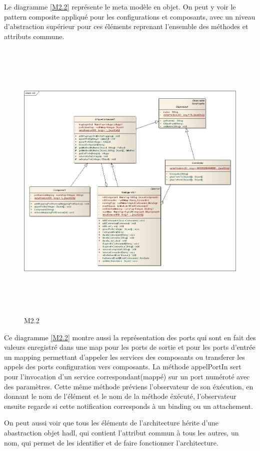 \documentclass[11pt,a4paper]{article}
\begin{document}
Le diagramme \ref{M2.2} représente le meta modèle en objet. On peut y voir le pattern composite appliqué pour les configurations et composants, avec un niveau d'abstraction supérieur pour ces éléments reprenant l'ensemble des méthodes et attributs commune.

\begin{figure}[h]
  		\centering
  		\includegraphics[height=14cm,width=15cm]{m2impl.jpg}
  		\caption{M2.2}
  		\label{Meta modèle objet}
\end{figure}

Ce diagramme \ref{M2.2} montre aussi la représentation des ports qui sont en fait des valeurs enregistré dans une map pour les ports de sortie et pour les ports d'entrée un mapping permettant d'appeler les services des composants ou transferer les appels des ports configuration vers composants. La méthode appelPortIn sert pour l'invocation d'un service correspondant(mappé) sur un port numéroté avec des paramètres. Cette même méthode préviens l'observateur de son éxécution, en donnant le nom de l'élément et le nom de la méthode éxécuté, l'observateur ensuite regarde si cette notification corresponds à un binding ou un attachement. 

On peut aussi voir que tous les éléments de l'architecture hérite d'une abastraction objet hadl, qui contient l'attribut commun à tous les autres, un nom, qui permet de les identifier et de faire fonctionner l'architecture. 
\end{document}
